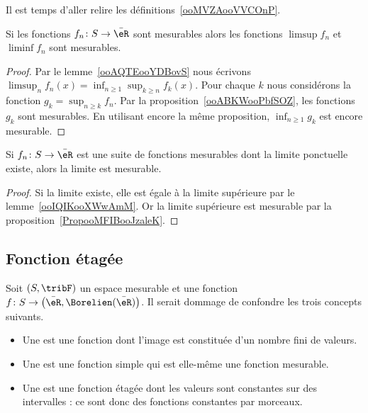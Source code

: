 Il est temps d'aller relire les définitions~\ref{ooMVZAooVVCOnP}.

\begin{proposition}     \label{PropooMFIBooJzaleK}
	Si les fonctions \( f_n\colon S\to \bar \eR\) sont mesurables alors les fonctions \( \limsup f_n\) et \( \liminf f_n\) sont mesurables.
\end{proposition}

\begin{proof}
	Par le lemme~\ref{ooAQTEooYDBovS} nous écrivons \( \limsup_nf_n(x)=\inf_{n\geq 1}\sup_{k\geq n} f_k(x)\). Pour chaque \( k\) nous considérons la fonction \( g_k=\sup_{n\geq k}f_n\). Par la proposition~\ref{ooABKWooPbfSOZ}, les fonctions \( g_k\) sont mesurables. En utilisant encore la même proposition, \( \inf_{n\geq 1}g_k\) est encore mesurable.
\end{proof}

\begin{proposition}      \label{PropooDXBGooSFqrai}
	Si \( f_n\colon S\to \bar \eR\) est une suite de fonctions mesurables dont la limite ponctuelle existe, alors la limite est mesurable.
\end{proposition}

\begin{proof}
	Si la limite existe, elle est égale à la limite supérieure par le lemme~\ref{ooIQIKooXWwAmM}. Or la limite supérieure est mesurable par la proposition~\ref{PropooMFIBooJzaleK}.
\end{proof}

\subsection{Fonction étagée}

\begin{definition}\label{DefBPCxdel}
	Soit \( (S,\tribF)\) un espace mesurable et une fonction \( f\colon S\to \big( \bar\eR,\Borelien(\bar\eR) \big)\). Il serait dommage de confondre les trois concepts suivants.
	\begin{itemize}
		\item
		      Une  est une fonction dont l'image est constituée d'un nombre fini de valeurs.
		\item
		      Une  est une fonction simple qui est elle-même une fonction mesurable.
		\item
		      Une  est une fonction étagée dont les valeurs sont constantes sur des intervalles : ce sont donc des fonctions constantes par morceaux.
	\end{itemize}
\end{definition}

